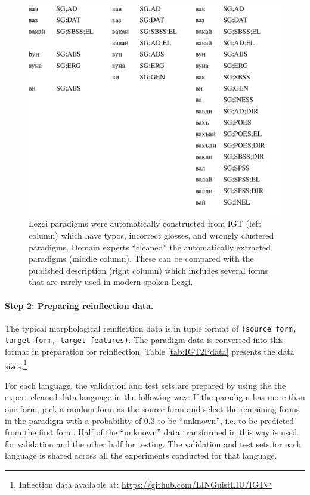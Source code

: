 \begin{figure}
    \centering
    \includegraphics[width=15cm]{figs/LezgiParadigms.pdf}
    \caption[Noisy to Clean Paradigms]{Lezgi paradigms were automatically constructed from IGT (left column) which have typos, incorrect glosses, and wrongly clustered paradigms. Domain experts ``cleaned'' the automatically extracted paradigms (middle column). These can be compared with the published description (right column) which includes several forms that are rarely used in modern spoken Lezgi.}
    \label{fig:cleaning}
\end{figure}

\paragraph{Step 2: Preparing reinflection data.}
The typical morphological reinflection data is in tuple format of \texttt{(source form, target form, target features)}. The paradigm data is converted into this format in preparation for reinflection. Table \ref{tab:IGT2Pdata} presents the data sizes.\footnote{Inflection data available at: \url{https://github.com/LINGuistLIU/IGT}} 

For each language, the validation and test sets are prepared by using the the expert-cleaned data language in the following way: If the paradigm has more than one form, pick a random form as the source form and select the remaining forms in the paradigm with a probability of 0.3 to be ``unknown'', i.e. to be predicted from the first form. Half of the ``unknown'' data transformed in this way is used for validation and the other half for testing. The validation and test sets for each language is shared across all the experiments conducted for that language.

